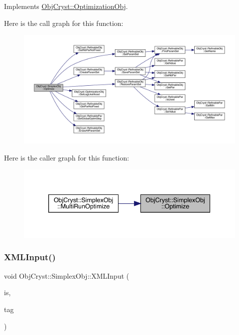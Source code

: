 Implements \mbox{\hyperlink{class_obj_cryst_1_1_optimization_obj_a08c77dc6ec80f63bf067ef2968a0b6dc}{Obj\+Cryst\+::\+Optimization\+Obj}}.

Here is the call graph for this function\+:
\nopagebreak
\begin{figure}[H]
\begin{center}
\leavevmode
\includegraphics[width=350pt]{class_obj_cryst_1_1_simplex_obj_aa5d987434598f3c6e2045b1446cfb064_cgraph}
\end{center}
\end{figure}
Here is the caller graph for this function\+:
\nopagebreak
\begin{figure}[H]
\begin{center}
\leavevmode
\includegraphics[width=339pt]{class_obj_cryst_1_1_simplex_obj_aa5d987434598f3c6e2045b1446cfb064_icgraph}
\end{center}
\end{figure}
\mbox{\label{class_obj_cryst_1_1_simplex_obj_aeeb9fa38eb4e321724665045c39ad709}} 
\subsubsection{\texorpdfstring{XMLInput()}{XMLInput()}}
{\footnotesize\ttfamily void Obj\+Cryst\+::\+Simplex\+Obj\+::\+X\+M\+L\+Input (\begin{DoxyParamCaption}\item[{istream \&}]{is,  }\item[{const \mbox{\hyperlink{class_obj_cryst_1_1_x_m_l_cryst_tag}{X\+M\+L\+Cryst\+Tag}} \&}]{tag }\end{DoxyParamCaption})\hspace{0.3cm}{\ttfamily [virtual]}}



